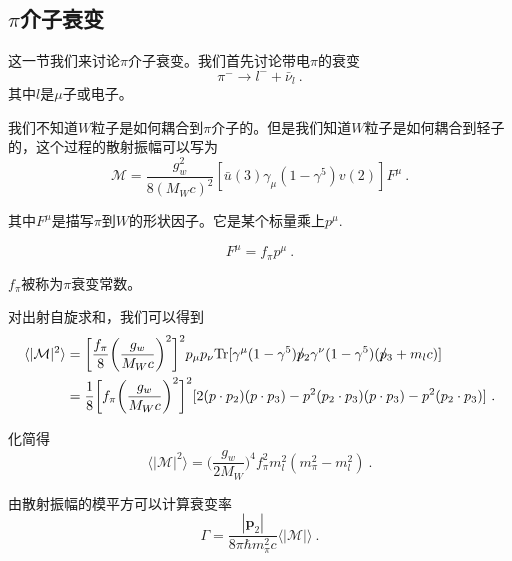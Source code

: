 



\subsection*{$\pi$介子衰变} 
这一节我们来讨论$\pi$介子衰变。我们首先讨论带电$\pi$的衰变 
\begin{equation}
\pi^- \rightarrow l^- + \bar \nu_l~.
\end{equation}
其中$l$是$\mu$子或电子。

我们不知道$W$粒子是如何耦合到$\pi$介子的。但是我们知道$W$粒子是如何耦合到轻子的，这个过程的散射振幅可以写为
\begin{equation}
\mathcal M = \frac{g_w^2}{8(M_W c)^2} [\bar u (3) \gamma_\mu (1-\gamma^5)v(2)] F^\mu~.
\end{equation}

其中$F^\mu$是描写$\pi$到$W$的形状因子。它是某个标量乘上$p^\mu$.

\begin{equation}
F^\mu = f_\pi p^\mu~. 
\end{equation}

$f_\pi$被称为$\pi$衰变常数。

对出射自旋求和，我们可以得到
\begin{equation}
\begin{aligned}
\langle |\mathcal M|^2 \rangle &= \bigg[ \frac{f_\pi}{8} \bigg( \frac{g_w}{M_W c} \bigg)^2  \bigg]^2 p_\mu p_\nu {\rm Tr} [\gamma^\mu (1-\gamma^5) p\!\!\!/_2\gamma^\nu (1-\gamma^5) (p\!\!\!/_3 + m_l c)   ] 
\\
& = \frac{1}{8} \bigg[ f_\pi \bigg( \frac{g_w}{M_W c} \bigg)^2 \bigg]^2 [2(p\cdot p_2)(p\cdot p_3) - p^2 (p_2\cdot p_3) (p\cdot p_3) - p^2 (p_2 \cdot p_3) ] ~.
\end{aligned}
\end{equation}

化简得
\begin{equation}
\langle |\mathcal M|^2 \rangle = \bigg( \frac{g_w}{2 M_W} \bigg)^4 f_\pi^2 m_l^2 (m_\pi^2 - m_l^2) ~.
\end{equation}

由散射振幅的模平方可以计算衰变率 
\begin{equation}
\Gamma = \frac{|\mathbf p_2|}{8\pi \hbar m_\pi^2 c} \langle | \mathcal M | \rangle ~.
\end{equation}


